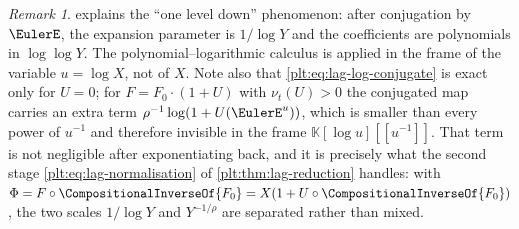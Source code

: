 \documentclass[11pt,oneside]{article}
\theoremstyle{plain}
\theoremstyle{definition}
\theoremstyle{remark}
\newtheorem{remark}[theorem]{Remark}
\newcommand{\K}{\mathbb{K}}
\newcommand{\ordt}{\nu_{t}}                              %
\newcommand{\compose}{\mathbin{\circ}}
\newcommand{\rev}[1]{\CompositionalInverseOf{#1}}
\begin{document}
\begin{remark}
\label{plt:rmk:lag-log-frame-scale}
 explains the ``one level down'' phenomenon:
after conjugation by \(\EulerE\), the expansion parameter is \(1/\log Y\) and
the coefficients are polynomials in \(\log\log Y\).  The polynomial--logarithmic
calculus is applied in the frame of the variable \(u=\log X\), not of \(X\).
Note also that \cref{plt:eq:lag-log-conjugate} is exact only for
\(U=0\); for \(F=F_0\cdot(1+U)\) with \(\ordt(U)>0\) the conjugated map carries
an extra term \(\rho^{-1}\log(1+U(\EulerE^{u}))\), which is smaller than every
power of \(u^{-1}\) and therefore invisible in the frame
\(\K[\log u][[u^{-1}]]\).  That term is not negligible after exponentiating
back, and it is precisely what the second stage
\cref{plt:eq:lag-normalisation} of \cref{plt:thm:lag-reduction} handles: with
\(\Phi=F\compose\rev{F_0}=X(1+U\compose\rev{F_0})\), the two scales
\(1/\log Y\) and \(Y^{-1/\rho}\) are separated rather than mixed.
\end{remark}
\end{document}
